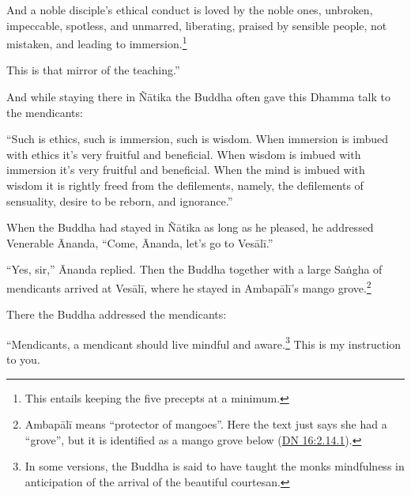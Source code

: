 \documentclass[12pt,openany]{book}%
\begin{document}
And a noble disciple’s ethical conduct is loved by the noble ones, unbroken, impeccable, spotless, and unmarred, liberating, praised by sensible people, not mistaken, and leading to immersion.\footnote{This entails keeping the five precepts at a minimum. } 

This is that mirror of the teaching.” 

And while staying there in \textsanskrit{Ñātika} the Buddha often gave this Dhamma talk to the mendicants: 

“Such is ethics, such is immersion, such is wisdom. When immersion is imbued with ethics it’s very fruitful and beneficial. When wisdom is imbued with immersion it’s very fruitful and beneficial. When the mind is imbued with wisdom it is rightly freed from the defilements, namely, the defilements of sensuality, desire to be reborn, and ignorance.” 

When the Buddha had stayed in \textsanskrit{Ñātika} as long as he pleased, he addressed Venerable Ānanda, “Come, Ānanda, let’s go to \textsanskrit{Vesālī}.” 

“Yes, sir,” Ānanda replied. Then the Buddha together with a large \textsanskrit{Saṅgha} of mendicants arrived at \textsanskrit{Vesālī}, where he stayed in \textsanskrit{Ambapālī}’s mango grove.\footnote{\textsanskrit{Ambapālī} means “protector of mangoes”. Here the text just says she had a “grove”, but it is identified as a mango grove below (\href{https://suttacentral.net/dn16/en/sujato\#2.14.1}{DN 16:2.14.1}). } 

There the Buddha addressed the mendicants: 

“Mendicants, a mendicant should live mindful and aware.\footnote{In some versions, the Buddha is said to have taught the monks mindfulness in anticipation of the arrival of the beautiful courtesan. } This is my instruction to you. 
\end{document}
